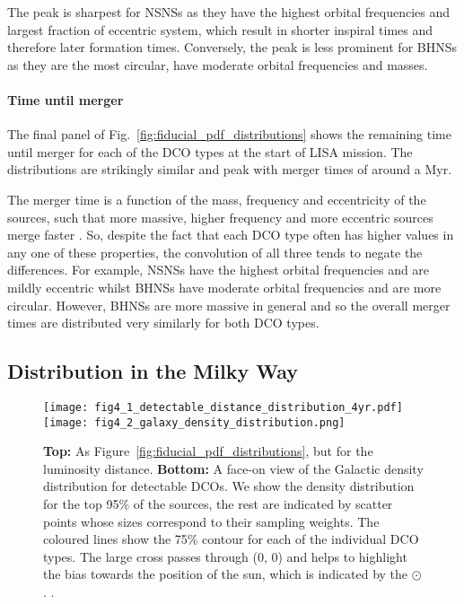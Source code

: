 The peak is sharpest for NSNSs as they have the highest orbital frequencies and largest fraction of eccentric system, which result in shorter inspiral times and therefore later formation times. Conversely, the peak is less prominent for BHNSs as they are the most circular, have moderate orbital frequencies and masses.

\paragraph{Time until merger} The final panel of Fig.~\ref{fig:fiducial_pdf_distributions} shows the remaining time until merger for each of the DCO types at the start of LISA mission. The distributions are strikingly similar and peak with merger times of around a Myr.

The merger time is a function of the mass, frequency and eccentricity of the sources, such that more massive, higher frequency and more eccentric sources merge faster \citep[][Eq.~5.14]{Peters+1964}. So, despite the fact that each DCO type often has higher values in any one of these properties, the convolution of all three tends to negate the differences. For example, NSNSs have the highest orbital frequencies and are mildly eccentric whilst BHNSs have moderate orbital frequencies and are more circular. However, BHNSs are more massive in general and so the overall merger times are distributed very similarly for both DCO types.

\subsection{Distribution in the Milky Way}\label{sec:mw_detectable_distribution}

\begin{figure}[tb]
    \centering
    \texttt{[image: fig4\_1\_detectable\_distance\_distribution\_4yr.pdf]}
    \texttt{[image: fig4\_2\_galaxy\_density\_distribution.png]}
    \caption{\textbf{Top:} As Figure~\ref{fig:fiducial_pdf_distributions}, but for the luminosity distance. \textbf{Bottom:} A face-on view of the Galactic density distribution for detectable DCOs. We show the density distribution for the top 95\% of the sources, the rest are indicated by scatter points whose sizes correspond to their sampling weights. The coloured lines show the 75\% contour for each of the individual DCO types. The large cross passes through (0, 0) and helps to highlight the bias towards the position of the sun, which is indicated by the $\odot$. \href{https://github.com/TomWagg/detecting-DCOs-in-LISA/blob/main/paper/figures/fig4_1_detectable_distance_distribution_4yr.png}{\faFileImage} \href{https://github.com/TomWagg/detecting-DCOs-in-LISA/blob/main/paper/figure_notebooks/fiducial.ipynb}{\faBook} \href{https://github.com/TomWagg/detecting-DCOs-in-LISA/blob/main/paper/figures/fig4_2_galaxy_density_distribution.png}{\faFileImage} \href{https://github.com/TomWagg/detecting-DCOs-in-LISA/blob/main/paper/figure_notebooks/galaxy_creation_station.ipynb}{\faBook}.}
    \label{fig:detectable_distance_dist}
\end{figure}

